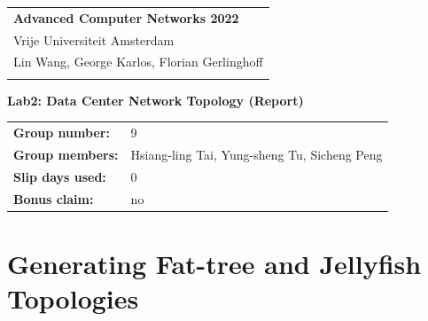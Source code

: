 \documentclass[a4paper,11pt]{article}
\begin{document}
\thispagestyle{empty} 

\begin{tabular}{@{}p{15.5cm}} 
{\bf Advanced Computer Networks 2022} \\
Vrije Universiteit Amsterdam \\ Lin Wang, George Karlos, Florian Gerlinghoff \\
\hline 
\\
\end{tabular} 

\vspace*{0.3cm} 

{\LARGE \bf Lab2: Data Center Network Topology (Report)} 

\vspace*{0.3cm} 


\begin{tcolorbox}[sharp corners, colback=blue!5!white]
\begin{tabular}{@{}ll}
\textbf{Group number:} & 9 \\
\textbf{Group members:} & Hsiang-ling Tai, Yung-sheng Tu, Sicheng Peng \\
\textbf{Slip days used:} & 0 \\
\textbf{Bonus claim:} & no
\end{tabular}
\end{tcolorbox}

\vspace{0.4cm}


\section{Generating Fat-tree and Jellyfish Topologies}
\end{document}
